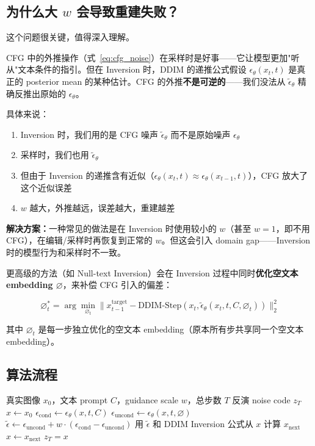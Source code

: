 \documentclass[11pt,a4paper]{article}
\theoremstyle{definition}
\begin{document}
\subsection{为什么大 $w$ 会导致重建失败？}

这个问题很关键，值得深入理解。

CFG 中的外推操作（式~\ref{eq:cfg_noise}）在采样时是好事——它让模型更加"听从"文本条件的指引。但在 Inversion 时，DDIM 的递推公式假设 $\epsilon_\theta(x_t, t)$ 是真正的 posterior mean 的某种估计。CFG 的外推\textbf{不是可逆的}——我们没法从 $\tilde{\epsilon}_\theta$ 精确反推出原始的 $\epsilon_\theta$。

具体来说：
\begin{enumerate}
    \item Inversion 时，我们用的是 CFG 噪声 $\tilde{\epsilon}_\theta$ 而不是原始噪声 $\epsilon_\theta$
    \item 采样时，我们也用 $\tilde{\epsilon}_\theta$
    \item 但由于 Inversion 的递推含有近似（$\epsilon_\theta(x_t, t) \approx \epsilon_\theta(x_{t-1}, t)$），CFG 放大了这个近似误差
    \item $w$ 越大，外推越远，误差越大，重建越差
\end{enumerate}

\textbf{解决方案：}一种常见的做法是在 Inversion 时使用较小的 $w$（甚至 $w=1$，即不用 CFG），在编辑/采样时再恢复到正常的 $w$。但这会引入 domain gap——Inversion 时的模型行为和采样时不一致。

更高级的方法（如 Null-text Inversion）会在 Inversion 过程中同时\textbf{优化空文本 embedding $\varnothing$}，来补偿 CFG 引入的偏差：

\begin{equation}\label{eq:null_text_opt}
    \varnothing^*_t = \arg\min_{\varnothing_t} \big\| x_{t-1}^{\text{target}} - \text{DDIM-Step}(x_t, \tilde{\epsilon}_\theta(x_t, t, C, \varnothing_t)) \big\|_2^2
\end{equation}

其中 $\varnothing_t$ 是每一步独立优化的空文本 embedding（原本所有步共享同一个空文本 embedding）。

\subsection{算法流程}

\begin{algorithm}[ht]
\caption{DDIM Inversion (with CFG)}
\label{alg:ddim_inversion}
\begin{algorithmic}[1]
\Require 真实图像 $x_0$，文本 prompt $C$，guidance scale $w$，总步数 $T$
\Ensure 反演 noise code $z_T$
\State $x \leftarrow x_0$
    \State $\epsilon_{\text{cond}} \leftarrow \epsilon_\theta(x, t, C)$
    \State $\epsilon_{\text{uncond}} \leftarrow \epsilon_\theta(x, t, \varnothing)$
    \State $\tilde{\epsilon} \leftarrow \epsilon_{\text{uncond}} + w \cdot (\epsilon_{\text{cond}} - \epsilon_{\text{uncond}})$
    \State 用 $\tilde{\epsilon}$ 和 DDIM Inversion 公式从 $x$ 计算 $x_{\text{next}}$
    \State $x \leftarrow x_{\text{next}}$
\EndFor
\State \Return $z_T = x$
\end{algorithmic}
\end{algorithm}
\end{document}

